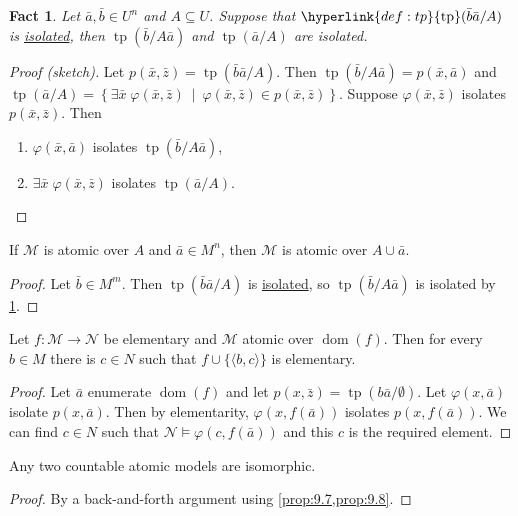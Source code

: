 \documentclass{article}
\let\models\vDash
\DeclareMathOperator{\dom}{dom}
\DeclareMathOperator{\tp}{tp}
\newtheorem{nfact}[nthm]{Fact}
\newcommand{\M}{\mathcal{M}}
\renewcommand{\N}{\mathcal{N}}
\begin{document}
\begin{nfact} \label{fact:9.6}
Let $\bar{a}, \bar{b} \in U^n$ and $A \subseteq U$. Suppose that $\hyperlink{def:tp}{\tp}(\bar{b}\bar{a}/A)$ is \hyperlink{def:isolate}{isolated}, then $\tp(\bar b/A\bar{a})$ and $\tp(\bar{a}/A)$ are isolated.
\end{nfact}
\begin{proof}[Proof (sketch)]
Let $p(\bar{x}, \bar{z}) = \tp(\bar{b}\bar{a}/A)$. Then $\tp(\bar{b}/A\bar{a}) = p(\bar{x},\bar{a})$ and $\tp(\bar{a}/A) = \left\{ \exists \bar{x} \; \varphi(\bar{x},\bar{z}) \ \middle|\ \varphi(\bar{x}, \bar{z}) \in p(\bar x, \bar z) \right\}$. Suppose $\varphi(\bar{x}, \bar{z})$ isolates $p(\bar{x},\bar{z})$. Then
\begin{enumerate}[label=(\roman*)]
\item $\varphi(\bar{x},\bar{a})$ isolates $\tp(\bar{b}/A\bar{a})$,
\item $\exists \bar{x}\; \varphi(\bar{x},\bar{z})$ isolates $\tp(\bar{a}/A)$. \qedhere
\end{enumerate}
\end{proof}
\begin{nprop} \label{prop:9.7}
If $\M$ is atomic over $A$ and $\bar{a} \in M^n$, then $\M$ is atomic over $A \cup \bar{a}$.
\end{nprop}
\begin{proof}
Let $\bar{b} \in M^m$. Then $\tp(\bar{b}\bar{a}/A)$ is \hyperlink{def:isolate}{isolated}, so $\tp(\bar{b}/A\bar{a})$ is isolated by \cref{fact:9.6}.
\end{proof}

\begin{nprop} \label{prop:9.8}
Let $f:\M \to \N$ be elementary and $\M$ atomic over $\dom(f)$. Then for every $b \in M$ there is $c \in N$ such that $f \cup \{ \langle b, c \rangle \}$ is elementary.
\end{nprop}
\begin{proof}
Let $\bar{a}$ enumerate $\dom(f)$ and let $p(x, \bar{z}) = \tp(b\bar{a}/\emptyset)$. Let $\varphi(x, \bar{a})$ isolate $p(x, \bar{a})$. Then by elementarity, $\varphi(x, f(\bar a))$ isolates $p(x, f(\bar{a}))$. We can find $c \in N$ such that $\N \models \varphi(c, f(\bar a))$ and this $c$ is the required element.
\end{proof}

\begin{nprop} \label{prop:9.9}
Any two countable atomic models are isomorphic.
\end{nprop}
\begin{proof}
By a back-and-forth argument using \cref{prop:9.7,prop:9.8}.
\end{proof}
\end{document}
